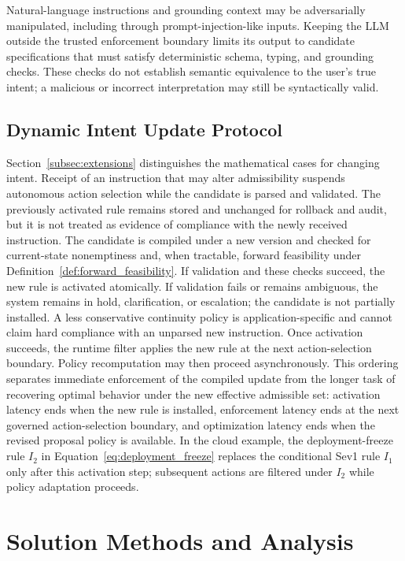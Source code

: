 \documentclass[journal]{IEEEtran}
\theoremstyle{definition}
\begin{document}
Natural-language instructions and grounding context may be adversarially
manipulated, including through prompt-injection-like inputs. Keeping the LLM
outside the trusted enforcement boundary limits its output to candidate
specifications that must satisfy deterministic schema, typing, and grounding
checks. These checks do not establish semantic equivalence to the user's true
intent; a malicious or incorrect interpretation may still be syntactically
valid.

\subsection{Dynamic Intent Update Protocol}
\label{subsec:update_protocol}

Section~\ref{subsec:extensions} distinguishes the mathematical cases for
changing intent. Receipt of an instruction that may alter admissibility
suspends autonomous action selection while the candidate is parsed and
validated. The previously activated rule remains stored and unchanged for
rollback and audit, but it is not treated as evidence of compliance with the
newly received instruction. The candidate is compiled under a new version and
checked for current-state nonemptiness and, when tractable, forward feasibility
under Definition~\ref{def:forward_feasibility}. If validation and these checks
succeed, the new rule is activated atomically. If validation fails or remains
ambiguous, the system remains in hold, clarification, or escalation; the
candidate is not partially installed. A less conservative continuity policy is
application-specific and cannot claim hard compliance with an unparsed new
instruction.
Once activation succeeds, the runtime filter applies the
new rule at the next action-selection boundary. Policy recomputation may then
proceed asynchronously. This ordering separates immediate enforcement of the
compiled update from the longer task of recovering optimal behavior under the
new effective admissible set: activation latency ends when the new rule is
installed, enforcement latency ends at the next governed action-selection
boundary, and optimization latency ends when the revised proposal policy is
available. In the cloud example, the deployment-freeze rule
$I_2$ in Equation~\eqref{eq:deployment_freeze} replaces the conditional Sev1
rule $I_1$ only after this activation step; subsequent actions are filtered
under $I_2$ while policy adaptation proceeds.

\section{Solution Methods and Analysis}
\label{sec:algorithms}
\end{document}

